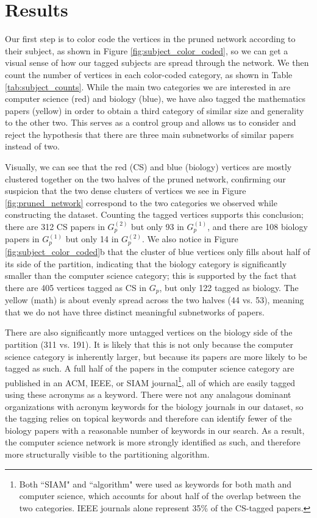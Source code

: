 \documentclass[12pt]{thesis}
\theoremstyle{plain}
\theoremstyle{definition}
\theoremstyle{remark}
\begin{document}
\section{Results}

Our first step is to color code the vertices in the pruned network according to their subject, as shown in Figure \ref{fig:subject_color_coded}, so we can get a visual sense of how our tagged subjects are spread through the network. We then count the number of vertices in each color-coded category, as shown in Table \ref{tab:subject_counts}. While the main two categories we are interested in are computer science (red) and biology (blue), we have also tagged the mathematics papers (yellow) in order to obtain a third category of similar size and generality to the other two. This serves as a control group and allows us to consider and reject the hypothesis that there are three main subnetworks of similar papers instead of two. 

Visually, we can see that the red (CS) and blue (biology) vertices are mostly clustered together on the two halves of the pruned network, confirming our suspicion that the two dense clusters of vertices we see in Figure \ref{fig:pruned_network} correspond to the two categories we observed while constructing the dataset. Counting the tagged vertices supports this conclusion; there are 312 CS papers in $G_p^{(2)}$ but only 93 in $G_p^{(1)}$, and there are 108 biology papers in $G_p^{(1)}$ but only 14 in $G_p^{(2)}$. We also notice in Figure \ref{fig:subject_color_coded}b that the cluster of blue vertices only fills about half of its side of the partition, indicating that the biology category is significantly smaller than the computer science category; this is supported by the fact that there are 405 vertices tagged as CS in $G_p$, but only 122 tagged as biology. The yellow (math) is about evenly spread across the two halves (44 vs. 53), meaning that we do not have three distinct meaningful subnetworks of papers. 

There are also significantly more untagged vertices on the biology side of the partition (311 vs. 191). It is likely that this is not only because the computer science category is inherently larger, but because its papers are more likely to be tagged as such. A full half of the papers in the computer science category are published in an ACM, IEEE, or SIAM journal\footnote{Both ``SIAM" and ``algorithm" were used as keywords for both math and computer science, which accounts for about half of the overlap between the two categories. IEEE journals alone represent 35\% of the CS-tagged papers.}, all of which are easily tagged using these acronyms as a keyword. There were not any analagous dominant organizations with acronym keywords for the biology journals in our dataset, so the tagging relies on topical keywords and therefore can identify fewer of the biology papers with a reasonable number of keywords in our search. As a result, the computer science network is more strongly identified as such, and therefore more structurally visible to the partitioning algorithm.
\end{document}
